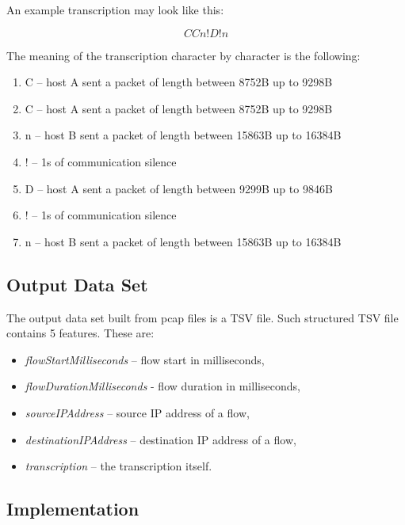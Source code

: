 \documentclass{article}
\begin{document}
\noindent An example transcription may look like this:

$$ CCn!D!n $$

\noindent The meaning of the transcription character by character is the following:

\begin{enumerate}
    \item C -- host A sent a packet of length between 8752B up to 9298B
    \item C -- host A sent a packet of length between 8752B up to 9298B
    \item n -- host B sent a packet of length between 15863B up to 16384B
    \item ! -- 1s of communication silence
    \item D -- host A sent a packet of length between 9299B up to 9846B
    \item ! -- 1s of communication silence
    \item n -- host B sent a packet of length between 15863B up to 16384B
\end{enumerate}


\subsection{Output Data Set}\label{sec-output-dataset}

The output data set built from pcap files is a TSV file. Such structured TSV file contains 5 features. These are:
\begin{itemize}
    \item \textit{flowStartMilliseconds} -- flow start in milliseconds,
    \item \textit{flowDurationMilliseconds} - flow duration in milliseconds,
    \item \textit{sourceIPAddress} -- source IP address of a flow,
    \item \textit{destinationIPAddress} -- destination IP address of a flow,
    \item \textit{transcription} -- the transcription itself.
\end{itemize}





\subsection{Implementation}
\end{document}
